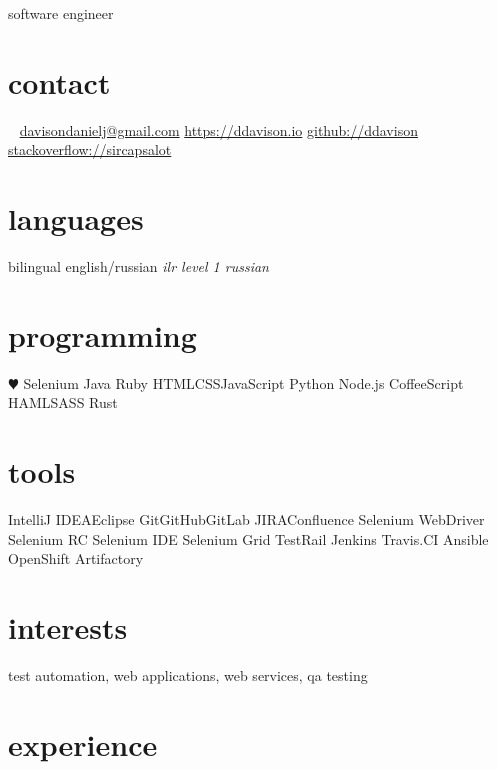 \documentclass[]{ddavison-resume}
\begin{document}
       {software engineer}


\begin{aside}
  \section{contact}
    ~
    \href{mailto:davisondanielj@gmail.com}{davisondanielj@gmail.com}
    \href{https://ddavison.io}{https://ddavison.io}
    \href{https://github.com/ddavison}{github://ddavison}
    \href{https://stackoverflow.com/users/1695163/sircapsalot}{stackoverflow://sircapsalot}
  \section{languages}
    bilingual english/russian
	\emph{ilr level 1 russian}
  \section{programming}
    {\color{red} $\varheartsuit$} Selenium
	Java     
    Ruby
    HTML\bullet CSS\bullet JavaScript
    Python    
    Node.js
    CoffeeScript
    HAML\bullet SASS
    Rust
  \section{tools}
	IntelliJ IDEA\bullet Eclipse  	
	Git\bullet GitHub\bullet GitLab	
  	JIRA\bullet Confluence
  	Selenium WebDriver
  	Selenium RC
  	Selenium IDE
  	Selenium Grid
  	TestRail
  	Jenkins
  	Travis.CI
  	Ansible
  	OpenShift
  	Artifactory  	
\end{aside}

\section{interests}

test automation, web applications, web services, qa testing

\section{experience}
\end{document}
